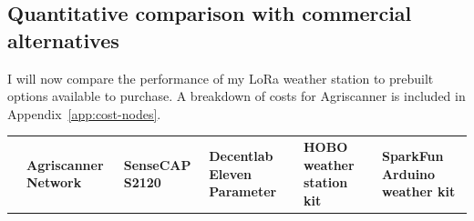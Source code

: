 \subsection{Quantitative comparison with commercial alternatives}

I will now compare the performance of my LoRa weather station to prebuilt
options available to purchase. A breakdown of costs for Agriscanner is included
in Appendix~\ref{app:cost-nodes}.

\begin{table}[H]
  \centering
  \small
  \renewcommand{\arraystretch}{1.2}
  \begin{tabularx}{\textwidth}{l >{\raggedright\arraybackslash}X
      >{\raggedright\arraybackslash}X >{\raggedright\arraybackslash}X
      >{\raggedright\arraybackslash}X >{\raggedright\arraybackslash}X}
    \hline
                                                    & \textbf{Agriscanner
    Network}                                        & \textbf{SenseCAP
    S2120\cite{pihut:sensecap-s2120-2025}}          & \textbf{Decentlab Eleven
    Parameter\cite{alliot:decentlab-eleven-2025}}   & \textbf{HOBO weather
    station kit\cite{weathershop:hobo-rx3000-2025}} & \textbf{SparkFun Arduino
    weather kit\cite{pihut:sparkfun-2025}} \\


\end{tabularx}
\end{table}

